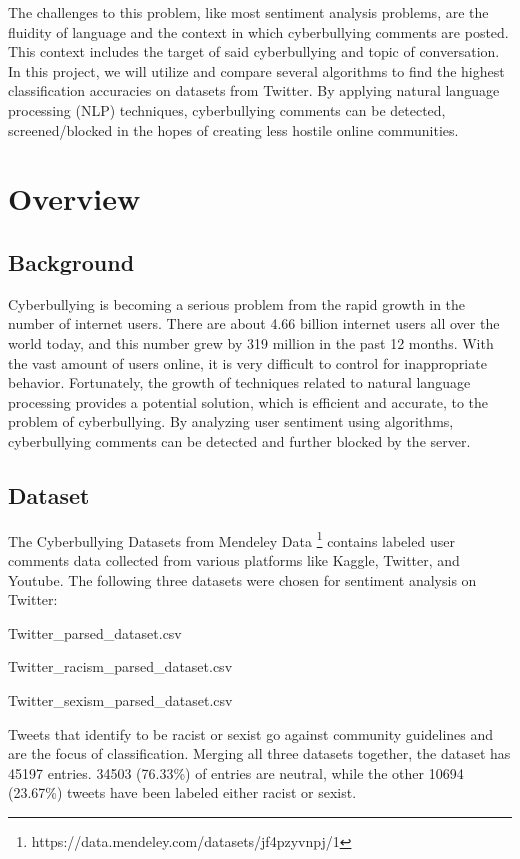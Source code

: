 \documentclass[conference]{IEEEtran}
\begin{document}
The challenges to this problem, like most sentiment analysis problems, are the fluidity of language and the context in which cyberbullying comments are posted. This context includes the target of said cyberbullying and topic of conversation. In this project, we will utilize and compare several algorithms to find the highest classification accuracies on datasets from Twitter. By applying natural language processing (NLP) techniques, cyberbullying comments can be detected, screened/blocked in the hopes of creating less hostile online communities. 


\section{Overview}

\subsection{Background}

Cyberbullying is becoming a serious problem from the rapid growth in the number of internet users. There are about 4.66 billion internet users all over the world today, and this number grew by 319 million in the past 12 months. With the vast amount of users online, it is very difficult to control for inappropriate behavior. Fortunately, the growth of techniques related to natural language processing provides a potential solution, which is efficient and accurate, to the problem of cyberbullying. By analyzing user sentiment using algorithms, cyberbullying comments can be detected and further blocked by the server.

\subsection{Dataset}

The Cyberbullying Datasets from Mendeley Data \footnote[1]{https://data.mendeley.com/datasets/jf4pzyvnpj/1} contains labeled user comments data collected from various platforms like Kaggle, Twitter, and Youtube. The following three datasets were chosen for sentiment analysis on Twitter:

\begin{center}
Twitter\_parsed\_dataset.csv

Twitter\_racism\_parsed\_dataset.csv

Twitter\_sexism\_parsed\_dataset.csv
\end{center}

Tweets that identify to be racist or sexist go against community guidelines and are the focus of classification. Merging all three datasets together, the dataset has 45197 entries. 34503 (76.33\%) of entries are neutral, while the other 10694 (23.67\%) tweets have been labeled either racist or sexist.
\end{document}
